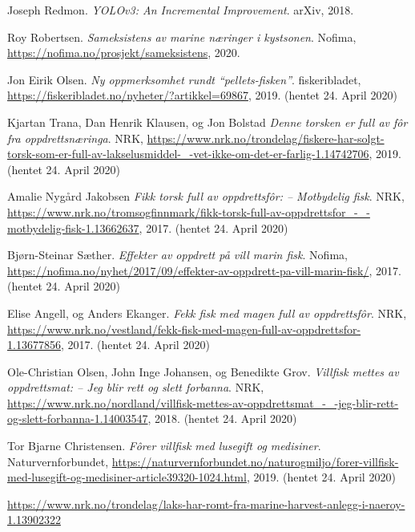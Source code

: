 \documentclass[11ot]{article}
\begin{document}
\begin{thebibliography}{9}
Joseph Redmon. 
\textit{YOLOv3: An Incremental Improvement}. 
arXiv, 2018.

Roy Robertsen. 
\textit{Sameksistens av marine næringer i kystsonen}. 
Nofima, \url{https://nofima.no/prosjekt/sameksistens}, 2020.

Jon Eirik Olsen. 
\textit{Ny oppmerksomhet rundt “pellets-fisken”}. 
fiskeribladet, \url{https://fiskeribladet.no/nyheter/?artikkel=69867}, 2019. (hentet 24. April 2020)

Kjartan Trana, Dan Henrik Klausen, og Jon Bolstad 
\textit{Denne torsken er full av fôr fra oppdrettsnæringa}. 
NRK, \url{https://www.nrk.no/trondelag/fiskere-har-solgt-torsk-som-er-full-av-lakselusmiddel-_-vet-ikke-om-det-er-farlig-1.14742706}, 2019. (hentet 24. April 2020)

 Amalie Nygård Jakobsen
\textit{Fikk torsk full av oppdrettsfôr: – Motbydelig fisk}. 
NRK, \url{https://www.nrk.no/tromsogfinnmark/fikk-torsk-full-av-oppdrettsfor_-_-motbydelig-fisk-1.13662637}, 2017. (hentet 24. April 2020)

Bjørn-Steinar Sæther. 
\textit{Effekter av oppdrett på vill marin fisk}. 
Nofima, \url{https://nofima.no/nyhet/2017/09/effekter-av-oppdrett-pa-vill-marin-fisk/}, 2017. (hentet 24. April 2020)

Elise Angell, og Anders Ekanger. 
\textit{Fekk fisk med magen full av oppdrettsfôr}. 
NRK, \url{https://www.nrk.no/vestland/fekk-fisk-med-magen-full-av-oppdrettsfor-1.13677856}, 2017. (hentet 24. April 2020)

Ole-Christian Olsen, John Inge Johansen, og Benedikte Grov. 
\textit{Villfisk mettes av oppdrettsmat: – Jeg blir rett og slett forbanna}. 
NRK, \url{https://www.nrk.no/nordland/villfisk-mettes-av-oppdrettsmat_-_-jeg-blir-rett-og-slett-forbanna-1.14003547}, 2018. (hentet 24. April 2020)

Tor Bjarne Christensen. 
\textit{Fôrer villfisk med lusegift og medisiner}. 
Naturvernforbundet, \url{https://naturvernforbundet.no/naturogmiljo/forer-villfisk-med-lusegift-og-medisiner-article39320-1024.html}, 2019. (hentet 24. April 2020)

\url{https://www.nrk.no/trondelag/laks-har-romt-fra-marine-harvest-anlegg-i-naeroy-1.13902322}

\end{thebibliography}
\end{document}
